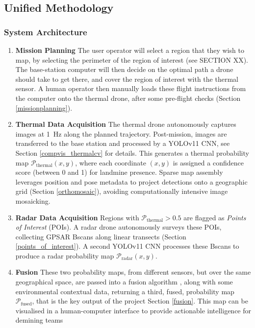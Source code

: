 \subsection{Unified Methodology} \label{compvis_methods}

    \subsubsection{System Architecture}
    
        \begin{enumerate}
        
            \item \textbf{Mission Planning} The user operator will select a region that they wish to map, by selecting the perimeter of the region of interest (see SECTION XX). The base-station computer will then decide on the optimal path a drone should take to get there, and cover the region of interest with the thermal sensor. A human operator then manually loads these flight instructions from the computer onto the thermal drone, after some pre-flight checks (Section \ref{missionplanning}).
            
            \item \textbf{Thermal Data Acquisition} The thermal drone autonomously captures images at 1~Hz along the planned trajectory. Post-mission, images are transferred to the base station and processed by a YOLOv11 CNN, see Section \ref{compvis_thermalcv} for details. This generates a thermal probability map \(\mathcal{P}_{\text{thermal}}(x,y)\), where each coordinate \((x,y)\) is assigned a confidence score (between 0 and 1) for landmine presence. Sparse map assembly leverages position and pose metadata to project detections onto a geographic grid  (Section \ref{orthomosaic}), avoiding computationally intensive image mosaicking.
            
            \item \textbf{Radar Data Acquisition} Regions with \(\mathcal{P}_{\text{thermal}} > 0.5\) are flagged as \textit{Points of Interest} (POIs). A radar drone autonomously surveys these POIs, collecting GPSAR Bscans along linear transects (Section \ref{points_of_interest}). A second YOLOv11 CNN processes these Bscans to produce a radar probability map \(\mathcal{P}_{\text{radar}}(x,y)\).
            
            \item \textbf{Fusion} These two probability maps, from different sensors, but over the same geographical space, are passed into a fusion algorithm , along with some environmental contextual data, returning a third, fused, probability map $\mathcal{P}_{\text{fused}}$, that is the key output of the project Section \ref{fusion}. This map can be visualised in a human-computer interface to provide actionable intelligence for demining teams
        \end{enumerate}
    
